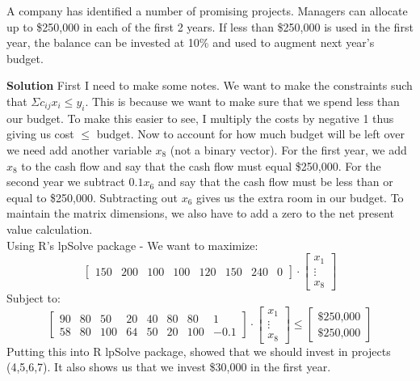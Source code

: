 \documentclass[12pt]{article}
\newenvironment{problem}[3][Problem]{\begin{trivlist}
\item[\hskip \labelsep {\bfseries #1}\hskip \labelsep {\bfseries #2.}]}{\end{trivlist}}
\begin{document}
\begin{problem}3. A company has identified a number of promising projects. Managers can allocate up to \$250,000 in each of the first 2 years. If less than \$250,000 is used in the first year, the balance can be invested at 10\% and used to augment next year's budget. 

\textbf{Solution} First I need to make some notes. We want to make the constraints such that $\Sigma c_{ij}x_i \leq y_i $. This is because we want to make sure that we spend less than our budget. To make this easier to see, I multiply the costs by negative 1 thus giving us cost $\leq $ budget. Now to account for how much budget will be left over we need add another variable $x_8$ (not a binary vector). For the first year, we add $x_8$ to the cash flow and say that the cash flow must equal \$250,000. For the second year we subtract $0.1x_6$ and say that the cash flow must be less than or equal to \$250,000. Subtracting out $x_6$ gives us the extra room in our budget. To maintain the matrix dimensions, we also have to add a zero to the net present value calculation. \\ Using R's lpSolve package - We want to maximize:
$$ 
\begin{bmatrix}
150 & 200 & 100 & 100 & 120 & 150 & 240 & 0
\end{bmatrix}
\cdot
\begin{bmatrix}
x_1\\ \vdots \\x_8 
\end{bmatrix}
$$
Subject to:  
$$
\begin{bmatrix}
90&80&50&20&40&80&80&1 \\
58&80&100&64&50&20&100&-0.1 
\end{bmatrix}
\cdot
\begin{bmatrix}
x_1\\ \vdots \\ x_8 
\end{bmatrix} 
\leq
\begin{bmatrix}
\text{\$ 250,000} \\ \text{\$ 250,000}
\end{bmatrix}
$$
Putting this into R lpSolve package, showed that we should invest in projects (4,5,6,7). It also shows us that we invest \$30,000 in the first year.
\end{problem}
\end{document}
